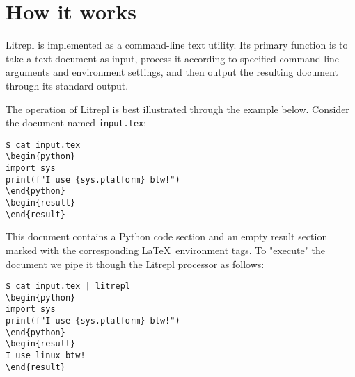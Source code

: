 \documentclass[letterpaper,12pt,twocolumn]{article}
\newcommand{\Latex}{\LaTeX\ }
\begin{document}
\section{How it works}

Litrepl is implemented as a command-line text utility. Its primary function is
to take a text document as input, process it according to specified command-line
arguments and environment settings, and then output the resulting document
through its standard output.

The operation of Litrepl is best illustrated through the example below. Consider
the document named \verb|input.tex|:

\begin{comment}
\begin{sh}
echo '\begin{verbatim}'
echo '$ cat input.tex'
cat input.tex
echo '\end{verbatim}'
\end{sh}
\end{comment}
\begin{verbatim}
$ cat input.tex
\begin{python}
import sys
print(f"I use {sys.platform} btw!")
\end{python}
\begin{result}
\end{result}
\end{verbatim}

This document contains a Python code section and an empty result section marked
with the corresponding \Latex environment tags. To "execute" the document we
pipe it though the Litrepl processor as follows:

\begin{comment}
\begin{sh}
echo '\begin{verbatim}'
echo '$ cat input.tex | litrepl'
echo "sys.platform='linux'" | litrepl repl python >/dev/null
cat input.tex | litrepl
echo '\end{verbatim}'
\end{sh}
\end{comment}
\begin{verbatim}
$ cat input.tex | litrepl
\begin{python}
import sys
print(f"I use {sys.platform} btw!")
\end{python}
\begin{result}
I use linux btw!
\end{result}
\end{verbatim}
\end{document}
